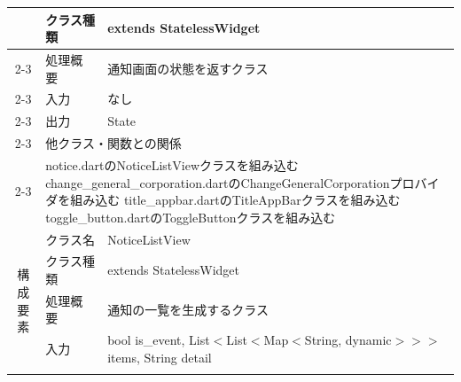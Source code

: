 \begin{table}[H]
\begin{tabular}{|c|l|l|}
                          & クラス種類                                                      & extends StatelessWidget                                                           \\ \cline{2-3}
                          & 処理概要                                                       & \multicolumn{1}{p{12cm}|}{通知画面の状態を返すクラス}                                          \\ \cline{2-3}
                          & 入力                                                         & なし                                                                                \\ \cline{2-3}
                          & 出力                                                         & State                                                                             \\ \cline{2-3}
                          & \multicolumn{2}{l|}{他クラス・関数との関係}                                                                                                               \\ \cline{2-3}
                          & \multicolumn{2}{p{14cm}|}{
      notice.dartのNoticeListViewクラスを組み込む
      \newline change\_general\_corporation.dartのChangeGeneralCorporationプロバイダを組み込む
      \newline title\_appbar.dartのTitleAppBarクラスを組み込む
    \newline toggle\_button.dartのToggleButtonクラスを組み込む}                                                                                                                     \\ \hline
    \multirow{7}{*}{構成要素} & クラス名                                                       & NoticeListView                                                                    \\ \cline{2-3}
                          & クラス種類                                                      & extends StatelessWidget                                                           \\ \cline{2-3}
                          & 処理概要                                                       & \multicolumn{1}{p{12cm}|}{通知の一覧を生成するクラス}                                          \\ \cline{2-3}
                          & 入力                                                         & bool is\_event, List$<$List$<$Map$<$String, dynamic$>$$>$$>$ items, String detail \\ \cline{2-3}

\end{tabular}
\end{table}
